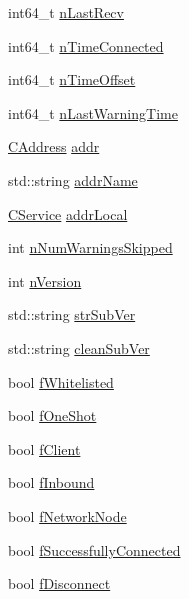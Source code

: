 \begin{DoxyCompactItemize}
\item 
int64\+\_\+t \mbox{\hyperlink{class_c_node_afb40f43a51ba686de93256727351af07}{n\+Last\+Recv}}
\item 
int64\+\_\+t \mbox{\hyperlink{class_c_node_abb39393ef08cb5668ded6cb14cdbc147}{n\+Time\+Connected}}
\item 
int64\+\_\+t \mbox{\hyperlink{class_c_node_a3079fadef397abbf7e8d444f4426ebe7}{n\+Time\+Offset}}
\item 
int64\+\_\+t \mbox{\hyperlink{class_c_node_a5ab6745f890f7d018b8ab278a4aaf039}{n\+Last\+Warning\+Time}}
\item 
\mbox{\hyperlink{class_c_address}{C\+Address}} \mbox{\hyperlink{class_c_node_a3993ecb1de2a2135a3cf0904346a6f88}{addr}}
\item 
std\+::string \mbox{\hyperlink{class_c_node_a3155cd313d85ec3ff691f8259a5f5345}{addr\+Name}}
\item 
\mbox{\hyperlink{class_c_service}{C\+Service}} \mbox{\hyperlink{class_c_node_a1b6517682efa0709f44780a95384c4ec}{addr\+Local}}
\item 
int \mbox{\hyperlink{class_c_node_a97a9784cba9ad06fd9444d940f5c011c}{n\+Num\+Warnings\+Skipped}}
\item 
int \mbox{\hyperlink{class_c_node_a99173eb3cef17e699ba21a5249ac33d2}{n\+Version}}
\item 
std\+::string \mbox{\hyperlink{class_c_node_afb24fb33019af5c4085412fe3898cf01}{str\+Sub\+Ver}}
\item 
std\+::string \mbox{\hyperlink{class_c_node_a05f0401427c5ffebd1ca404848e83ff7}{clean\+Sub\+Ver}}
\item 
bool \mbox{\hyperlink{class_c_node_ad3096c14b54aa39a02edb63a4a734c3e}{f\+Whitelisted}}
\item 
bool \mbox{\hyperlink{class_c_node_a2bb91c9968a9f855c05b1121100a8797}{f\+One\+Shot}}
\item 
bool \mbox{\hyperlink{class_c_node_a721e2470c2c961b7599768a14be68781}{f\+Client}}
\item 
bool \mbox{\hyperlink{class_c_node_a64b2550ec558b6106ebc122d450ad35b}{f\+Inbound}}
\item 
bool \mbox{\hyperlink{class_c_node_a933adb2b192939545a01d602b1d7b53a}{f\+Network\+Node}}
\item 
bool \mbox{\hyperlink{class_c_node_ab58c1772b2698e348d86002f34254119}{f\+Successfully\+Connected}}
\item 
bool \mbox{\hyperlink{class_c_node_af2f7ea958313974e8a948292f060922e}{f\+Disconnect}}
\item 

\end{DoxyCompactItemize}
